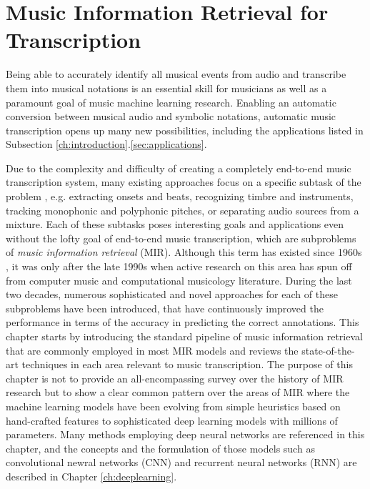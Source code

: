 
\graphicspath{{2-mir/figures/}}

\chapter{Music Information Retrieval for Transcription}
\label{ch:mir}

Being able to accurately identify all musical events from audio and transcribe them into musical notations is an essential skill for musicians as well as a paramount goal of music machine learning research.
Enabling an automatic conversion between musical audio and symbolic notations, automatic music transcription opens up many new possibilities, including the applications listed in Subsection \ref{ch:introduction}.\ref{sec:applications}.


Due to the complexity and difficulty of creating a completely end-to-end music transcription system, many existing approaches focus on a specific subtask of the problem \cite{casey2008mir}, e.g. extracting onsets and beats, recognizing timbre and instruments, tracking monophonic and polyphonic pitches, or separating audio sources from a mixture.
Each of these subtasks poses interesting goals and applications even without the lofty goal of end-to-end music transcription, which are subproblems of \emph{music information retrieval} (MIR).
Although this term has existed since 1960s \cite{kassler1966mir}, it was only after the late 1990s when active research on this area has spun off from computer music and computational musicology literature.
During the last two decades, numerous sophisticated and novel approaches for each of these subproblems have been introduced, that have continuously improved the performance in terms of the accuracy in predicting the correct annotations.
This chapter starts by introducing the standard pipeline of music information retrieval that are commonly employed in most MIR models and reviews the state-of-the-art techniques in each area relevant to music transcription.
The purpose of this chapter is not to provide an all-encompassing survey over the history of MIR research but to show a clear common pattern over the areas of MIR where the machine learning models have been evolving from simple heuristics based on hand-crafted features to sophisticated deep learning models with millions of parameters.
Many methods employing deep neural networks are referenced in this chapter, and the concepts and the formulation of those models such as convolutional newral networks (CNN) and recurrent neural networks (RNN) are described in Chapter \ref{ch:deeplearning}.


